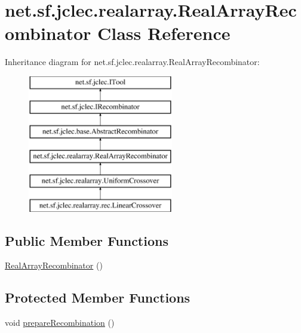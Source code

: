 \hypertarget{classnet_1_1sf_1_1jclec_1_1realarray_1_1_real_array_recombinator}{\section{net.\-sf.\-jclec.\-realarray.\-Real\-Array\-Recombinator Class Reference}
\label{classnet_1_1sf_1_1jclec_1_1realarray_1_1_real_array_recombinator}
}
Inheritance diagram for net.\-sf.\-jclec.\-realarray.\-Real\-Array\-Recombinator\-:\begin{figure}[H]
\begin{center}
\leavevmode
\includegraphics[height=6.000000cm]{classnet_1_1sf_1_1jclec_1_1realarray_1_1_real_array_recombinator}
\end{center}
\end{figure}
\subsection*{Public Member Functions}
\begin{DoxyCompactItemize}
\item 
\hyperlink{classnet_1_1sf_1_1jclec_1_1realarray_1_1_real_array_recombinator_a97deee83f01e9fb4b9e26b2a8d350efe}{Real\-Array\-Recombinator} ()
\end{DoxyCompactItemize}
\subsection*{Protected Member Functions}
\begin{DoxyCompactItemize}
\item 
void \hyperlink{classnet_1_1sf_1_1jclec_1_1realarray_1_1_real_array_recombinator_a003b9f2418aaeab559017b9e8385bd46}{prepare\-Recombination} ()
\end{DoxyCompactItemize}
